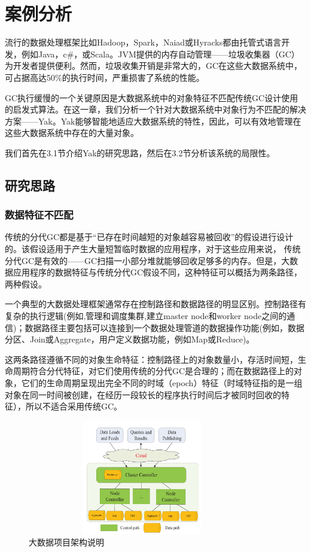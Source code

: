 
\chapter{案例分析}
流行的数据处理框架比如Hadoop，Spark，Naiad或Hyracks都由托管式语言开发，例如Java，c\#，或Scala。JVM提供的内存自动管理——垃圾收集器（GC）为开发者提供便利。然而，垃圾收集开销是非常大的，GC在这些大数据系统中，可占据高达50\%的执行时间，严重损害了系统的性能。

GC执行缓慢的一个关键原因是大数据系统中的对象特征不匹配传统GC设计使用的启发式算法。在这一章，我们分析一个针对大数据系统中对象行为不匹配的解决方案——Yak。Yak能够智能地适应大数据系统的特性，因此，可以有效地管理在这些大数据系统中存在的大量对象。

我们首先在3.1节介绍Yak的研究思路，然后在3.2节分析该系统的局限性。


\section{研究思路}
\subsection{数据特征不匹配}

传统的分代GC都是基于“已存在时间越短的对象越容易被回收”的假设进行设计的。该假设适用于产生大量短暂临时数据的应用程序，对于这些应用来说， 传统分代GC是有效的——GC扫描一小部分堆就能够回收足够多的内存。但是，大数据应用程序的数据特征与传统分代GC假设不同，这种特征可以概括为两条路径，两种假设。

一个典型的大数据处理框架通常存在控制路径和数据路径的明显区别。控制路径有复杂的执行逻辑(例如,管理和调度集群,建立master node和worker node之间的通信)；数据路径主要包括可以连接到一个数据处理管道的数据操作功能(例如，数据分区、Join或Aggregate，用户定义数据功能，例如Map或Reduce)。

这两条路径遵循不同的对象生命特征：控制路径上的对象数量小，存活时间短，生命周期符合分代特征，对它们使用传统的分代GC是合理的；而在数据路径上的对象，它们的生命周期呈现出完全不同的时域（epoch）特征（时域特征指的是一组对象在同一时间被创建，在经历一段较长的程序执行时间后才被同时回收的特征），所以不适合采用传统GC。
\begin{figure}[h]
    \centering
    \includegraphics[width=10cm,height=5cm]{figure/two_Path.png}
    \caption{大数据项目架构说明}
\end{figure}


